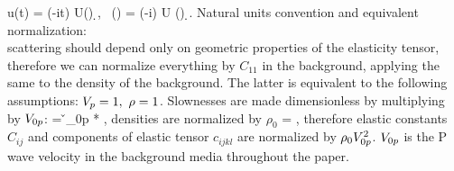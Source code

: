 \beq 
u(t) = \inty \exp(-i\omega t) U(\omega) \d \omega,~ (\Kv) = \intyV \exp(-i\Kv\xv) U (\xv) \d \xv.
\eeq
Natural units convention and equivalent normalization: 
\\ 
scattering should depend only on geometric properties of the elasticity tensor, therefore we can normalize everything by $C_{11}$ in the background, applying the same to the density of the background. The latter is equivalent to the following assumptions:
$V_p = 1, ~ \rho = 1$.
Slownesses are made dimensionless by multiplying by $V_{0p}$:
\beq
\svn = \v_{0p} * \sv,
\eeq
densities are normalized by $\rho_0$
\beq
\nmz{\rho} = ,
\eeq
therefore elastic constants $C_{ij}$ and components of elastic tensor $c_{ijkl}$ are normalized by $\rho_0 V^2_{0p}$.
$V_{0p}$ is the P wave velocity in the background media throughout the paper.


 






